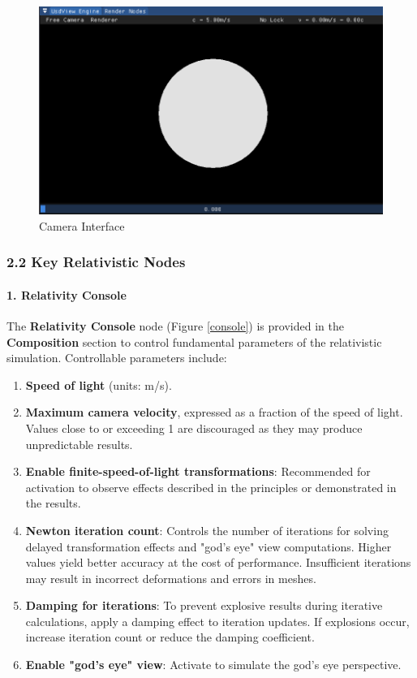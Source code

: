 \documentclass{article}
\begin{document}
\begin{figure}[htbp]
    \centering
    \setlength{\abovecaptionskip}{0.cm}
    \begin{minipage}[b]{0.8\linewidth}
        \centering
        \includegraphics[width=\textwidth]{Camera.png}
        \caption{Camera Interface}
        \label{camera}
    \end{minipage}
\end{figure}

\subsubsection*{2.2 Key Relativistic Nodes}

\paragraph{1. Relativity Console}
The \textbf{Relativity Console} node (Figure \ref{console}) is provided in the \textbf{Composition} section to control fundamental parameters of the relativistic simulation. Controllable parameters include:

\begin{enumerate}[(1)]
    \item \textbf{Speed of light} (units: m/s).
    \item \textbf{Maximum camera velocity}, expressed as a fraction of the speed of light. Values close to or exceeding 1 are discouraged as they may produce unpredictable results.
    \item \textbf{Enable finite-speed-of-light transformations}: Recommended for activation to observe effects described in the principles or demonstrated in the results.
    \item \textbf{Newton iteration count}: Controls the number of iterations for solving delayed transformation effects and "god's eye" view computations. Higher values yield better accuracy at the cost of performance. Insufficient iterations may result in incorrect deformations and errors in meshes.
    \item \textbf{Damping for iterations}: To prevent explosive results during iterative calculations, apply a damping effect to iteration updates. If explosions occur, increase iteration count or reduce the damping coefficient.
    \item \textbf{Enable "god's eye" view}: Activate to simulate the god's eye perspective.
\end{enumerate}
\end{document}
